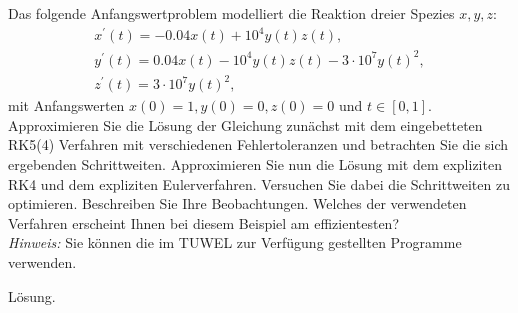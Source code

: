 \begin{exercise}
Das folgende Anfangswertproblem modelliert die Reaktion dreier Spezies
$x,y,z:$
\begin{align*}
  x^{\prime}(t) = -0.04x(t) + 10^4y(t)z(t), \\
  y^{\prime}(t) = 0.04x(t) - 10^4y(t)z(t) - 3\cdot10^7y(t)^2, \\
  z^{\prime}(t) = 3\cdot10^7y(t)^2,
\end{align*}
mit Anfangswerten $x(0) = 1, y(0) = 0, z(0) = 0$ und $t \in [0,1]$.
Approximieren Sie die Lösung der Gleichung zunächst mit dem
eingebetteten RK5(4) Verfahren mit verschiedenen Fehlertoleranzen und
betrachten Sie die sich ergebenden Schrittweiten. Approximieren Sie nun
die Lösung mit dem expliziten RK4 und dem expliziten Eulerverfahren.
Versuchen Sie dabei die Schrittweiten zu optimieren. Beschreiben Sie
Ihre Beobachtungen. Welches der verwendeten Verfahren erscheint Ihnen
bei diesem Beispiel am effizientesten? \\
\textit{Hinweis:} Sie können die im TUWEL zur Verfügung gestellten
Programme verwenden.
\end{exercise}
\begin{solution}
Lösung.
\end{solution}
